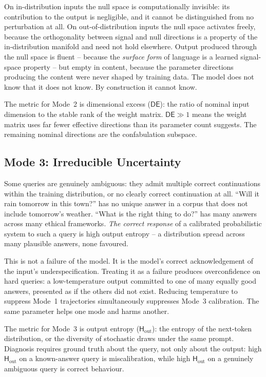 \documentclass[11pt,a4paper]{article}
\newcommand{\DE}{\mathsf{DE}}
\newcommand{\Hout}{\mathsf{H}_{\mathrm{out}}}
\begin{document}
On in-distribution inputs the null space is computationally invisible: its contribution to the output is negligible, and it cannot be distinguished from no perturbation at all. On out-of-distribution inputs the null space activates freely, because the orthogonality between signal and null directions is a property of the in-distribution manifold and need not hold elsewhere. Output produced through the null space is fluent -- because the \emph{surface form} of language is a learned signal-space property -- but empty in content, because the parameter directions producing the content were never shaped by training data. The model does not know that it does not know. By construction it cannot know.

The metric for Mode~2 is dimensional excess ($\DE$): the ratio of nominal input dimension to the stable rank of the weight matrix. $\DE \gg 1$ means the weight matrix uses far fewer effective directions than its parameter count suggests. The remaining nominal directions are the confabulation subspace.


\subsection{Mode 3: Irreducible Uncertainty}
\label{sec:mode3}

Some queries are genuinely ambiguous: they admit multiple correct continuations within the training distribution, or no clearly correct continuation at all. ``Will it rain tomorrow in this town?'' has no unique answer in a corpus that does not include tomorrow's weather. ``What is the right thing to do?'' has many answers across many ethical frameworks. \emph{The correct response} of a calibrated probabilistic system to such a query is high output entropy -- a distribution spread across many plausible answers, none favoured.

This is not a failure of the model. It is the model's correct acknowledgement of the input's underspecification. Treating it as a failure produces overconfidence on hard queries: a low-temperature output committed to one of many equally good answers, presented as if the others did not exist. Reducing temperature to suppress Mode~1 trajectories simultaneously suppresses Mode~3 calibration. The same parameter helps one mode and harms another.

The metric for Mode~3 is output entropy ($\Hout$): the entropy of the next-token distribution, or the diversity of stochastic draws under the same prompt. Diagnosis requires ground truth about the query, not only about the output: high $\Hout$ on a known-answer query is miscalibration, while high $\Hout$ on a genuinely ambiguous query is correct behaviour.
\end{document}
